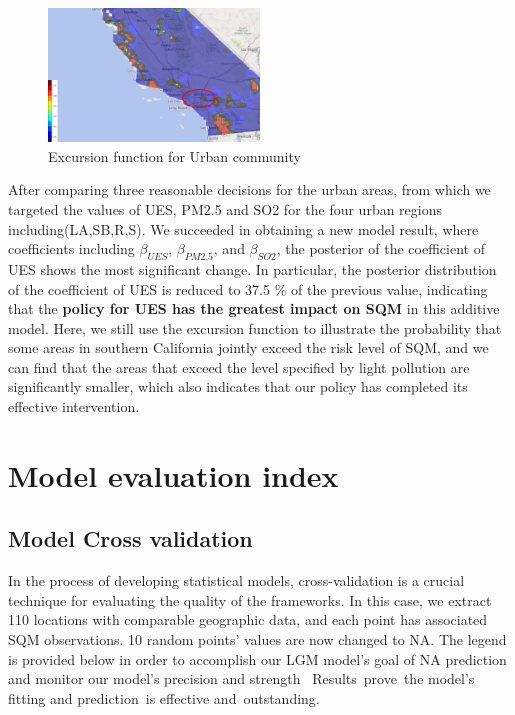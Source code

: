 \documentclass{mcmthesis}
\begin{document}
\begin{figure}[htp]
    \centering
    \includegraphics[width=0.5\textwidth]{images/qwq1.png}
    \caption{Excursion function for Urban community}
    \label{pre1}
\end{figure}

After comparing three reasonable decisions for the urban areas, from which we targeted the values of UES, PM2.5 and SO2 for the four urban regions including(LA,SB,R,S). We succeeded in obtaining a new model result, where coefficients including $\beta_{UES}$, $\beta_{PM2.5}$, and $\beta_{SO2}$, the posterior of the coefficient of UES shows the most significant change. In particular, the posterior distribution of the coefficient of UES is reduced to 37.5 $\%$ of the previous value, indicating that the\textbf{ policy for UES has the greatest impact on SQM} in this additive model. Here, we still use the excursion function to illustrate the probability that some areas in southern California jointly exceed the risk level of SQM, and we can find that the areas that exceed the level specified by light pollution are significantly smaller, which also indicates that our policy has completed its effective intervention.





\section{Model evaluation index}

\subsection{Model Cross validation}
In the process of developing statistical models, cross-validation is a crucial technique for evaluating the quality of the frameworks. In this case, we extract 110 locations with comparable geographic data, and each point has associated SQM observations. 10 random points' values are now changed to NA. The legend is provided below in order to accomplish our LGM model's goal of NA prediction and monitor our model's precision and strength  Results prove the model's fitting and prediction is effective and outstanding.
\end{document}
